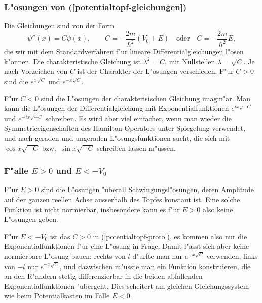 \subsubsection{L"osungen von (\ref{potentialtopf-gleichungen})}
Die Gleichungen sind von der Form
\begin{equation}
\psi''(x)=C\psi(x),\qquad
C=-\frac{2m}{\hbar^2}(V_0+E)
\quad
\text{oder}
\quad
C=-\frac{2m}{\hbar^2}E,
\label{potentialtopf-proto}
\end{equation}
die wir mit dem Standardverfahren f"ur lineare Differentialgleichungen
l"osen k"onnen.
Die charakteristische  Gleichung ist $\lambda^2=C$, mit Nullstellen
$\lambda=\sqrt{C}$. Je nach Vorzeichen von $C$ ist der Charakter der
L"osungen verschieden.
F"ur $C>0$ sind die $e^{x\sqrt{C}}$ und $e^{-x\sqrt{C}}$.

F"ur $C<0$ sind die L"osungen der charakterisischen Gleichung imagin"ar.
Man kann die L"osungen der Differentialgleichung mit Exponentialfunktionen
$e^{ix\sqrt{-C}}$ und $e^{-ix\sqrt{-C}}$ schreiben.
Es wird aber viel einfacher, wenn man wieder die Symmetrieeigenschaften
des Hamilton-Operators unter Spiegelung
verwendet, und nach geraden und ungeraden L"osungsfunktionen sucht,
die sich mit $\cos x\sqrt{-C}$ bzw.~$\sin x\sqrt{-C}$ schreiben
lassen m"ussen.

\subsubsection{F"alle $E>0$ und $E<-V_0$}
F"ur $E>0$ sind die L"osungen "uberall Schwingungsl"osungen, deren
Amplitude auf der ganzen reellen Achse ausserhalb des Topfes
konstant ist. Eine solche Funktion ist nicht normierbar, insbesondere
kann es f"ur $E>0$ also keine L"osungen geben.

F"ur $E<-V_0$ ist das $C>0$ in (\ref{potentialtopf-proto}), es kommen
also nur die Exponentialfunktionen f"ur eine L"osung in Frage.
Damit l"asst sich aber keine normierbare L"osung bauen: rechts von $l$
d"urfte man nur $e^{-x\sqrt{C}}$ verwenden, links von $-l$ nur
$e^{-x\sqrt{C}}$, und dazwischen m"usste man ein Funktion konstruieren,
die an den R"andern stetig differenzierbar in die beiden abfallenden
Exponentialfunktionen "ubergeht.
Dies scheitert am gleichen Gleichungssystem wie beim Potentialkasten
im Falle $E<0$.

